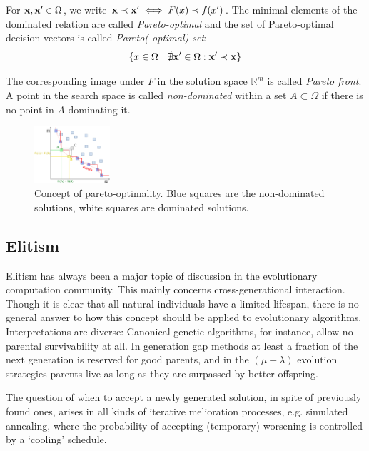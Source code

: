 \documentclass[%
 reprint,
 amsmath,amssymb,
 aps,
]{revtex4-2}
\newcommand{\bb}[1]
{\mathbb{#1}}
\begin{document}
For $\bold{x}, \bold{x}' \in \Omega$, we write $\bold{x} \prec \bold{x}' \iff F(x) \prec f(x')$. The minimal elements of the dominated relation are called \textit{Pareto-optimal} and the set of Pareto-optimal decision vectors is called \textit{Pareto(-optimal) set}: 
\begin{equation}
\{x \in \Omega\ | \ \nexists \bold{x}' \in \Omega: \bold{x}' \prec \bold{x}\}
\end{equation}

The corresponding image under $F$ in the solution space $\bb{R}^m$ is called \textit{Pareto front}. A point in the search space is called \textit{non-dominated} within a set $A \subset \Omega$ if there is no point in $A$ dominating it.


\begin{figure}[b]
\includegraphics[width=0.25\textwidth]{fig_0}%
\caption{\label{fig:pareto-optimality} Concept of pareto-optimality. Blue squares are the non-dominated solutions, white squares are dominated solutions.}
\end{figure}


\subsection{\label{sec:level2}Elitism}

\cite{AunifiedmodelLaumanns}
Elitism has always been a major topic of discussion in the evolutionary computation community. This mainly concerns
cross-generational interaction. Though it is clear that all natural
individuals have a limited lifespan, there is no general
answer to how this concept should be applied to evolutionary
algorithms. Interpretations are diverse: Canonical genetic algorithms,
for instance, allow no parental survivability at all.
In generation gap methods at least a fraction of the next generation
is reserved for good parents, and in the $(\mu + \lambda)$ evolution strategies parents live as long as they are surpassed by better offspring.

The question of when to accept a newly generated solution,
in spite of previously found ones, arises in all kinds
of iterative melioration processes, e.g. simulated annealing,
where the probability of accepting (temporary) worsening is
controlled by a `cooling' schedule.
\end{document}

